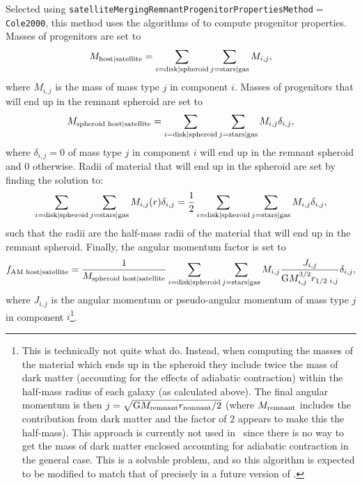 Selected using {\tt satelliteMergingRemnantProgenitorPropertiesMethod}$=${\tt Cole2000}, this method uses the algorithms of \cite{cole_hierarchical_2000} to compute progenitor properties. Masses of progenitors are set to
\begin{equation}
 M_{\rm host|satellite} = \sum_{i={\rm disk|spheroid}} \sum_{j={\rm stars|gas}} M_{i,j},
\end{equation}
where $M_{i,j}$ is the mass of mass type $j$ in \gls{component} $i$. Masses of progenitors that will end up in the remnant spheroid are set to
\begin{equation}
 M_{\rm spheroid\,\,host|satellite} = \sum_{i={\rm disk|spheroid}} \sum_{j={\rm stars|gas}} M_{i,j} \delta_{i,j},
\end{equation}
where $\delta_{i,j}=0$ of mass type $j$ in \gls{component} $i$ will end up in the remnant spheroid and $0$ otherwise. Radii of material that will end up in the spheroid are set by finding the solution to:
\begin{equation}
\sum_{i={\rm disk|spheroid}} \sum_{j={\rm stars|gas}} M_{i,j}(r) \delta_{i,j} = {1 \over 2} \sum_{i={\rm disk|spheroid}} \sum_{j={\rm stars|gas}} M_{i,j} \delta_{i,j},
\end{equation}
such that the radii are the half-mass radii of the material that will end up in the remnant spheroid. Finally, the angular momentum factor is set to
\begin{equation}
 f_{\rm AM\,\,host|satellite} = {1 \over M_{\rm spheroid\,\,host|satellite}} \sum_{i={\rm disk|spheroid}} \sum_{j={\rm stars|gas}} M_{i,j} {J_{i,j} \over {\rm G} M^{3/2}_{i,j} r_{1/2\,\,i,j}} \delta_{i,j},
\end{equation}
where $J_{i,j}$ is the angular momentum or pseudo-angular momentum of mass type $j$ in \gls{component} $i$\footnote{This is technically not quite what \protect\cite{cole_hierarchical_2000} do. Instead, when computing the masses of the material which ends up in the spheroid they include twice the mass of dark matter (accounting for the effects of adiabatic contraction) within the half-mass radius of each galaxy (as calculated above). The final angular momentum is then $j=\sqrt{{\rm G} M_{\rm remnant} r_{\rm remnant}/2}$ (where $M_{\rm remnant}$ includes the contribution from dark matter and the factor of $2$ appears to make this the half-mass). This approach is currently not used in \protect\glc\ since there is no way to get the mass of dark matter enclosed accounting for adiabatic contraction in the general case. This is a solvable problem, and so this algorithm is expected to be modified to match that of \protect\cite{cole_hierarchical_2000} precisely in a future version of \protect\glc.}.


